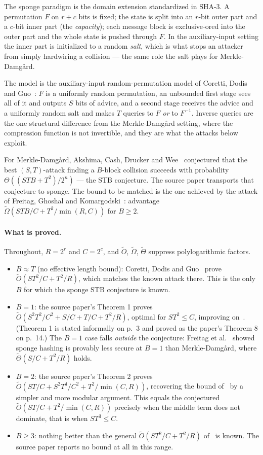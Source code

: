 \documentclass{aicr-conjecture}
\newcommand{\tO}{\tilde{O}}
\newcommand{\tOm}{\tilde{\Omega}}
\newcommand{\tTh}{\tilde{\Theta}}
\begin{document}
The sponge paradigm is the domain extension standardized in SHA-3. A
permutation $F$ on $r + c$ bits is fixed; the state is split into an
$r$-bit outer part and a $c$-bit inner part (the \emph{capacity}); each
message block is exclusive-ored into the outer part and the whole state
is pushed through $F$. In the auxiliary-input setting the inner part is
initialized to a random \emph{salt}, which is what stops an attacker
from simply hardwiring a collision --- the same role the salt plays for
Merkle-Damg\aa{}rd.

The model is the auxiliary-input random-permutation model of Coretti,
Dodis and Guo~\cite{CDG18}: $F$ is a uniformly random permutation, an
unbounded first stage sees all of it and outputs $S$ bits of advice, and
a second stage receives the advice and a uniformly random salt and makes
$T$ queries to $F$ \emph{or} to $F^{-1}$. Inverse queries are the one
structural difference from the Merkle-Damg\aa{}rd setting, where the
compression function is not invertible, and they are what the attacks
below exploit.

For Merkle-Damg\aa{}rd, Akshima, Cash, Drucker and Wee~\cite{ACDW20}
conjectured that the best $(S,T)$-attack finding a $B$-block collision
succeeds with probability $\Theta((STB + T^{2})/2^{n})$ --- the STB
conjecture. The source paper transports that conjecture to sponge. The
bound to be matched is the one achieved by the attack of Freitag,
Ghoshal and Komargodski~\cite{FGK22}: advantage $\tOm(STB/C +
T^{2}/\min(R,C))$ for $B \ge 2$.

\paragraph{What is proved.}
Throughout, $R = 2^{r}$ and $C = 2^{c}$, and $\tO$, $\tOm$, $\tTh$
suppress polylogarithmic factors.

\begin{itemize}
\item $B \approx T$ (no effective length bound): Coretti, Dodis and
  Guo~\cite{CDG18} prove $\tO(ST^{2}/C + T^{2}/R)$, which matches the
  known attack there. This is the only $B$ for which the sponge STB
  conjecture is known.
\item $B = 1$: the source paper's Theorem 1 proves
  $\tO(S^{2}T^{2}/C^{2} + S/C + T/C + T^{2}/R)$, optimal for
  $ST^{2} \le C$, improving on~\cite{FGK22}. (Theorem 1 is stated
  informally on p.~3 and proved as the paper's Theorem 8 on p.~14.) The $B = 1$ case falls
  \emph{outside} the conjecture: Freitag et al.~\cite{FGK22} showed
  sponge hashing is
  provably less secure at $B = 1$ than Merkle-Damg\aa{}rd, where
  $\tTh(S/C + T^{2}/R)$ holds.
\item $B = 2$: the source paper's Theorem 2 proves
  $\tO(ST/C + S^{2}T^{4}/C^{2} + T^{2}/\min(C,R))$, recovering the
  bound of~\cite{FGK22} by a simpler and more modular argument. This
  equals the conjectured $\tO(ST/C + T^{2}/\min(C,R))$ precisely when
  the middle term does not dominate, that is when $ST^{3} \le C$.
\item $B \ge 3$: nothing better than the general $\tO(ST^{2}/C +
  T^{2}/R)$ of~\cite{CDG18} is known. The source paper reports no
  bound at all in this range.
\end{itemize}
\end{document}

